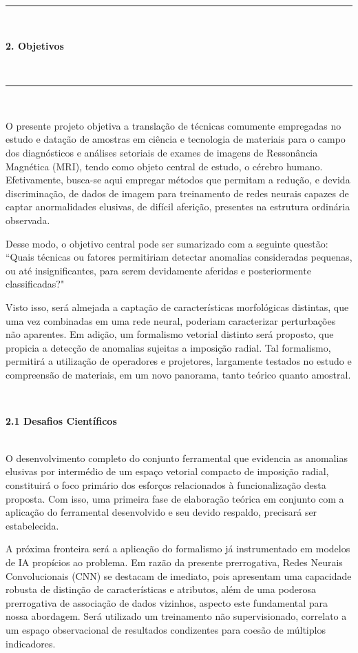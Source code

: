 \documentclass[a4paper, 12pt]{report}
\begin{document}
\newpage
\hrule $\frac{}{}$\\
\begin{LARGE}
\textbf{2. Objetivos}
\end{LARGE}
\\ \hrule $\frac{}{}$\par

O presente projeto objetiva a translação de técnicas comumente empregadas no estudo e datação de amostras em ciência e tecnologia de materiais para o campo dos diagnósticos e análises setoriais de exames de imagens de Ressonância Magnética (MRI), tendo como objeto central de estudo, o cérebro humano. Efetivamente, busca-se aqui empregar métodos que permitam a redução, e devida discriminação, de dados de imagem para treinamento de redes neurais capazes de captar anormalidades elusivas, de difícil aferição, presentes na estrutura ordinária observada.

Desse modo, o objetivo central pode ser sumarizado com a seguinte questão: ``Quais técnicas ou fatores permitiriam detectar anomalias consideradas pequenas, ou até insignificantes, para serem devidamente aferidas e posteriormente classificadas?"

Visto isso, será almejada a captação de características morfológicas distintas, que uma vez combinadas em uma rede neural, poderiam caracterizar perturbações não aparentes. Em adição, um formalismo vetorial distinto será proposto, que propicia a detecção de anomalias sujeitas a imposição radial. Tal formalismo, permitirá a utilização de operadores e projetores, largamente testados no estudo e compreensão de materiais, em um novo panorama, tanto teórico quanto amostral.

$\frac{}{}$\\
\begin{Large}
	\textbf{2.1 Desafios Científicos}
\end{Large}
$\frac{}{}$\\

O desenvolvimento completo do conjunto ferramental que evidencia as anomalias elusivas por intermédio de um espaço vetorial compacto de imposição radial, constituirá o foco primário dos esforços relacionados à funcionalização desta proposta. Com isso, uma primeira fase de elaboração teórica em conjunto com a aplicação do ferramental desenvolvido e seu devido respaldo, precisará ser estabelecida. 

A próxima fronteira será a aplicação do formalismo já instrumentado em modelos de IA propícios ao problema. Em razão da presente prerrogativa, Redes Neurais Convolucionais (CNN) se destacam de imediato, pois apresentam uma capacidade robusta de distinção de características e atributos, além de uma poderosa prerrogativa de associação de dados vizinhos, aspecto este fundamental para nossa abordagem. Será utilizado um treinamento não supervisionado, correlato a um espaço observacional de resultados condizentes para coesão de múltiplos indicadores. 
\end{document}
